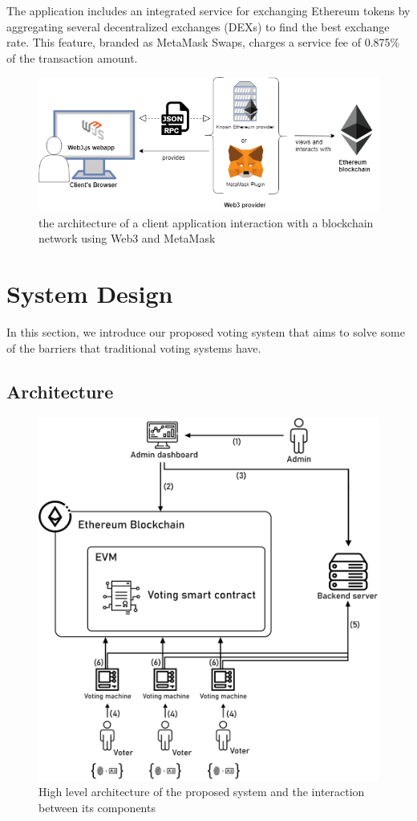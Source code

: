 The application includes an integrated service for exchanging Ethereum tokens by aggregating several decentralized exchanges (DEXs) to find the best exchange rate. This feature, branded as MetaMask Swaps, charges a service fee of 0.875\% of the transaction amount\cite{schroederCryptoWalletMetaMask2021}.

\begin{figure}[h]
	\centering
		\includegraphics[width=12cm]{images/chapter3/web3-architecture.png}
		\caption{{\footnotesize the architecture of a client application interaction with a blockchain network using Web3 and MetaMask}}
\end{figure}

\section{System Design}

In this section, we introduce our proposed voting system that aims to solve some of the barriers that traditional voting systems have.

\subsection{Architecture}

\begin{figure}[H]
	\centering
		\includegraphics[width=12cm]{images/chapter3/architecture.png}
		\caption{{\footnotesize High level architecture of the proposed system and the interaction between its components}}
\end{figure}

